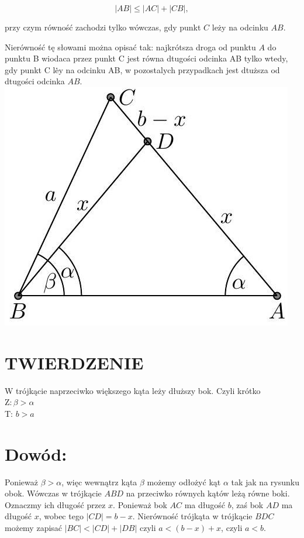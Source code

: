 \documentclass[10pt]{article}
\begin{document}
\[
|A B| \leqslant|A C|+|C B|,
\]

przy czym równość zachodzi tylko wówczas, gdy punkt \(C\) leży na odcinku \(A B\).

Nierówność tę słowami można opisać tak: najkrótsza droga od punktu \(A\) do punktu B wiodaca przez punkt C jest równa dtugości odcinka AB tylko wtedy, gdy punkt C lė̇y na odcinku AB, w pozostalych przypadkach jest dtuższa od dtugości odcinka \(A B\).\\
\includegraphics[max width=\textwidth, center]{2024_11_21_71f62bd117d375398909g-173(1)}

\section*{TWIERDZENIE}
W trójkącie naprzeciwko większego kąta leży dłuższy bok. Czyli krótko\\
\(\mathrm{Z}: \beta>\alpha\)\\
T: \(b>a\)

\section*{Dowód:}
Ponieważ \(\beta>\alpha\), więc wewnątrz kąta \(\beta\) możemy odłożyć kąt \(\alpha\) tak jak na rysunku obok. Wówczas w trójkącie \(A B D\) na przeciwko równych kątów leżą równe boki.\\
Oznaczmy ich długość przez \(x\). Ponieważ bok \(A C\) ma długość \(b\), zaś bok \(A D\) ma długość \(x\), wobec tego \(|C D|=b-x\). Nierówność trójkąta w trójkącie \(B D C\) możemy zapisać \(|B C|<|C D|+|D B|\) czyli \(a<(b-x)+x\), czyli \(a<b\).
\end{document}
